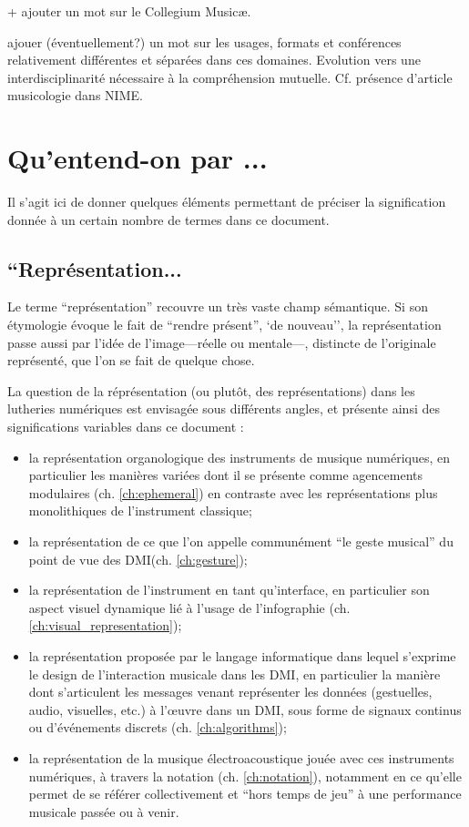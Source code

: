 + ajouter un mot sur le Collegium Musicæ.

ajouer (éventuellement?) un mot sur les usages, formats et conférences relativement différentes et séparées dans ces domaines. 
Evolution vers une interdisciplinarité nécessaire à la compréhension mutuelle. Cf. présence d'article musicologie dans NIME.


\section{Qu'entend-on par ...}

Il s'agit ici de donner quelques éléments permettant de préciser la signification donnée à un certain nombre de termes dans ce document.

\subsection*{``Représentation...}

Le terme ``représentation'' recouvre un très vaste champ sémantique. Si son étymologie évoque le fait de ``rendre présent'', `de nouveau'', la représentation passe aussi par l'idée de l'image—réelle ou mentale—, distincte de l'originale représenté, que l'on se fait de quelque chose.

La question de la réprésentation (ou plutôt, des représentations) dans les lutheries numériques est envisagée sous différents angles, et présente ainsi des significations variables dans ce document : 
\vspace{-1em}
\begin{itemize}[noitemsep]
\item la représentation organologique des instruments de musique numériques, en particulier les manières variées dont il se présente comme agencements modulaires (ch. \ref{ch:ephemeral}) en contraste avec les représentations plus monolithiques de l'instrument classique;
\item la représentation de ce que l'on appelle communément ``le geste musical'' du point de vue des \gls{DMI}(ch. \ref{ch:gesture});
\item la représentation de l'instrument en tant qu'interface, en particulier son aspect visuel dynamique lié à l'usage de l'infographie (ch. \ref{ch:visual_representation});
\item la représentation proposée par le langage informatique dans lequel s'exprime le design de l'interaction musicale dans les \gls{DMI}, en particulier la manière dont s'articulent les messages venant représenter les données (gestuelles, audio, visuelles, etc.) à l'œuvre dans un DMI, sous forme de signaux continus ou d'événements discrets (ch. \ref{ch:algorithms});
\item la représentation de la musique électroacoustique jouée avec ces instruments numériques, à travers la notation (ch. \ref{ch:notation}), notamment en ce qu'elle permet de se référer collectivement et ``hors temps de jeu'' à une performance musicale passée ou à venir.
\end{itemize}

